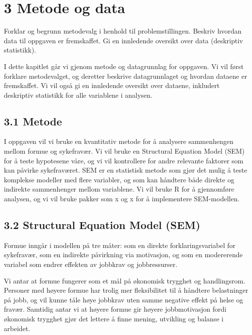 \documentclass[
  12pt,
  a4paper,
  DIV=11,
  numbers=noendperiod]{scrartcl}
\begin{document}
\newpage

\section{3 Metode og data}\label{metode-og-data}

Forklar og begrunn metodevalg i henhold til problemstillingen. Beskriv
hvordan data til oppgaven er fremskaffet. Gi en innledende oversikt over
data (deskriptiv statistikk).

I dette kapitlet går vi gjenom metode og datagrunnlag for oppgaven. Vi
vil først forklare metodevalget, og deretter beskrive datagrunnlaget og
hvordan dataene er fremskaffet. Vi vil også gi en innledende oversikt
over dataene, inkludert deskriptiv statistikk for alle variablene i
analysen.

\subsection{3.1 Metode}\label{metode}

I oppgaven vil vi bruke en kvantitativ metode for å analysere
sammenhengen mellom formue og sykefravær. Vi vil bruke en Structural
Equation Model (SEM) for å teste hypotesene våre, og vi vil kontrollere
for andre relevante faktorer som kan påvirke sykefraværet. SEM er en
statistisk metode som gjør det mulig å teste komplekse modeller med
flere variabler, og som kan håndtere både direkte og indirekte
sammenhenger mellom variablene. Vi vil bruke R for å gjennomføre
analysen, og vi vil bruke pakker som x og x for å implementere
SEM-modellen.

\subsection{3.2 Structural Equation Model
(SEM)}\label{structural-equation-model-sem}

Formue inngår i modellen på tre måter: som en direkte
forklaringsvariabel for sykefravær, som en indirekte påvirkning via
motivasjon, og som en modererende variabel som endrer effekten av
jobbkrav og jobbressurser.

Vi antar at formue fungerer som et mål på økonomisk trygghet og
handlingsrom. Personer med høyere formue har trolig mer fleksibilitet
til å håndtere belastninger på jobb, og vil kunne tåle høye jobbkrav
uten samme negative effekt på helse og fravær. Samtidig antar vi at
høyere formue gir høyere jobbmotivasjon fordi økonomisk trygghet gjør
det lettere å finne mening, utvikling og balanse i arbeidet.
\end{document}

